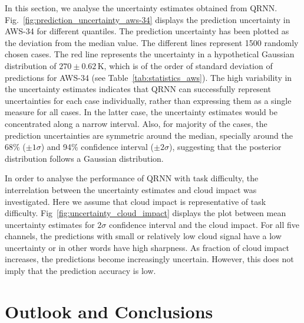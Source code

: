 \documentclass[amt, manuscript]{copernicus}
\begin{document}
In this section, we analyse the uncertainty estimates obtained from QRNN.  Fig.~\ref{fig:prediction_uncertainty_aws-34} displays the prediction uncertainty in AWS-34 for different quantiles. The prediction uncertainty has been plotted as the deviation from the median value.  The different lines represent 1500 randomly chosen cases.  The red line represents the uncertainty in a hypothetical Gaussian distribution of $270\pm0.62$\,K, which is of the order of standard deviation of predictions for AWS-34 (see Table~\ref{tab:statistics_aws}). The high variability in the uncertainty estimates indicates that QRNN can successfully represent uncertainties for each case individually, rather than expressing them as a single measure for all cases. In the latter case, the uncertainty estimates would be concentrated along a narrow interval. Also, for majority of the cases, the prediction uncertainties are symmetric around the median, specially around  the 68\% ($\pm 1 \sigma$) and 94\% confidence interval ($\pm 2 \sigma$), suggesting that the posterior distribution follows a Gaussian distribution. 

In order to analyse the performance of QRNN with task difficulty, the interrelation between the uncertainty estimates and cloud impact was investigated. Here we assume that cloud impact is representative of task difficulty. Fig~\ref{fig:uncertainty_cloud_impact} displays the plot between mean uncertainty estimates for $2\sigma$ confidence interval and the cloud impact. For all five channels, the predictions with small or relatively low cloud signal have a low uncertainty or in other words have high sharpness. As fraction of cloud impact increases, the predictions become increasingly uncertain. However, this does not imply that the prediction accuracy is low. 

\section{Outlook and Conclusions}  %





\end{document}
